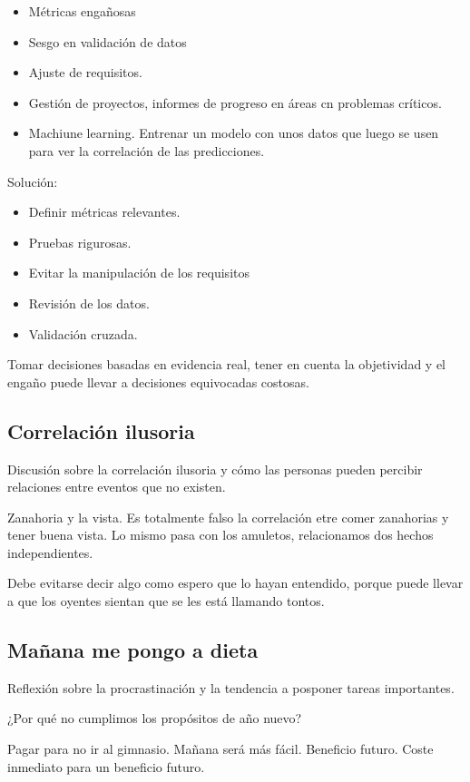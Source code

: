 \documentclass[12pt, a4paper, twoside]{article}
\begin{document}
\begin{itemize}
    \item Métricas engañosas
    \item Sesgo en validación de datos
    \item Ajuste de requisitos.
    \item Gestión de proyectos, informes de progreso en áreas cn problemas críticos.
    \item Machiune learning. Entrenar un modelo con unos datos que luego se usen para ver la correlación de las predicciones.
\end{itemize}

Solución:

\begin{itemize}
    \item Definir métricas relevantes.
    \item Pruebas rigurosas.
    \item Evitar la manipulación de los requisitos
    \item Revisión de los datos.
    \item Validación cruzada.
\end{itemize}

Tomar decisiones basadas en evidencia real, tener en cuenta la objetividad y el engaño puede llevar a decisiones equivocadas costosas.

\subsection{Correlación ilusoria}
Discusión sobre la correlación ilusoria y cómo las personas pueden percibir relaciones entre eventos que no existen.

Zanahoria y la vista. Es totalmente falso la correlación etre comer zanahorias y tener buena vista. Lo mismo pasa con los 
amuletos, relacionamos dos hechos independientes.

Debe evitarse decir algo como espero que lo hayan entendido, porque puede llevar a que los oyentes sientan que se les está llamando tontos.


\subsection{Mañana me pongo a dieta}
Reflexión sobre la procrastinación y la tendencia a posponer tareas importantes.

¿Por qué no cumplimos los propósitos de año nuevo?

Pagar para no ir al gimnasio. Mañana será más fácil. Beneficio futuro. 
Coste inmediato para un beneficio futuro.
\end{document}
